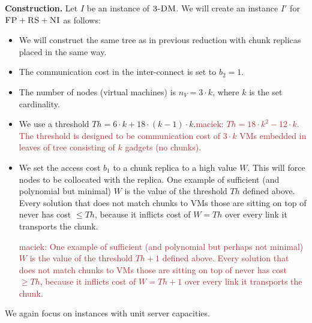 \documentclass[9pt]{sigcomm-alternate}
\newcommand{\maciek}[1]{\textcolor{brown}{maciek: #1}}
\newcommand{\CC}{\textsc{NI}}
\newcommand{\FP}{\textsc{FP}}
\newcommand{\RS}{\textsc{RS}}
\newcommand{\CostTrans}{\ensuremath{b_1}}
\newcommand{\CostCom}{\ensuremath{b_2}}
\newcommand{\Vms}{\ensuremath{n_V}}
\newcommand{\TDM}{\textsc{3-DM}}
\newcommand{\Thr}{\ensuremath{Th}}
\begin{document}
\textbf{Construction.}
Let $I$ be an instance of $\TDM$. We will create an instance $I'$
for $\FP+\RS+\CC$ as follows:
\begin{itemize}
\item We will construct the same tree as in previous reduction with
chunk replicas placed in the same way.
\item The communication cost in the inter-connect is set to $\CostCom = 1$.
\item The number of nodes (virtual machines) is $\Vms = 3 \cdot k$, where $k$ is the set cardinality.
\item We use a threshold $\Thr =  6 \cdot k + 18 \cdot 
(k - 1) \cdot k$.\maciek{$\Thr = 18 \cdot k^2 - 12 \cdot k$. The threshold is designed to be communication cost of $3\cdot k$ VMs embedded in leaves of tree consisting of $k$ gadgets (no chunks).}
\item We set the access cost $\CostTrans$ to a chunk replica to a high value $W$. This will force
nodes to be collocated with the replica. One example of sufficient
(and polynomial but minimal) $W$
is the value of the threshold $\Thr$ defined above. Every solution that does not match chunks to VMs those are sitting on top of never has cost $\leq \Thr$, because it inflicts cost of $W=\Thr$ over every link it transports the chunk.

\maciek{One example of sufficient
(and polynomial but perhaps not minimal) $W$
is the value of the threshold $\Thr+1$ defined above. Every solution that does not match chunks to VMs those are sitting on top of never has cost $\geq \Thr$, because it inflicts cost of $W=\Thr+1$ over every link it transports the chunk.}


\end{itemize}

We again focus on instances with unit server capacities.
\end{document}
